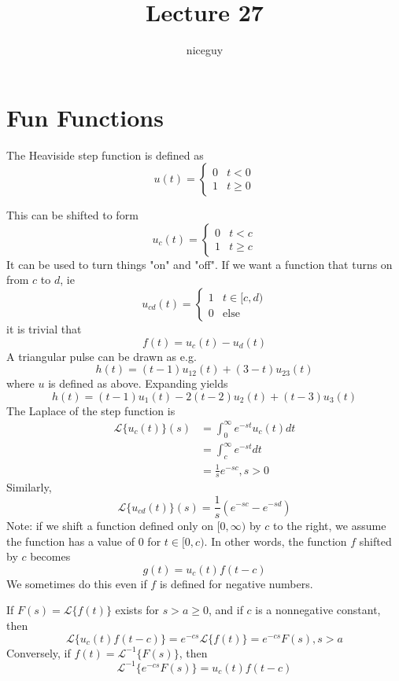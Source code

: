 \documentclass[12pt]{article}
\title{Lecture 27}
\author{niceguy}
\begin{document}
\maketitle

\section{Fun Functions}

\begin{defn}
	The Heaviside step function is defined as
	$$u(t) = \begin{cases} 0 & t < 0 \\ 1 & t \geq 0\end{cases}$$
\end{defn}
This can be shifted to form
$$u_c(t) = \begin{cases} 0 & t < c \\ 1 & t \geq c\end{cases}$$
It can be used to turn things "on" and "off". If we want a function that turns on from $c$ to $d$, ie
$$u_{cd}(t) = \begin{cases} 1 & t \in[c,d) \\ 0 & \text{else}\end{cases}$$
it is trivial that
$$f(t) = u_c(t) - u_d(t)$$
A triangular pulse can be drawn as e.g.
$$h(t) = (t-1)u_{12}(t) + (3-t)u_{23}(t)$$
where $u$ is defined as above. Expanding yields
$$h(t) = (t-1)u_1(t) - 2(t-2)u_2(t) + (t-3)u_3(t)$$
The Laplace of the step function is
\begin{align*}
	\mathcal{L}\{u_c(t)\}(s) &= \int_0^\infty e^{-st}u_c(t)dt \\
				 &= \int_c^\infty e^{-st}dt \\
				 &= \frac{1}{s}e^{-sc}, s > 0
\end{align*}
Similarly,
$$\mathcal{L}\{u_{cd}(t)\}(s) = \frac{1}{s}\left(e^{-sc} - e^{-sd}\right)$$
Note: if we shift a function defined only on $[0,\infty)$ by $c$ to the right, we assume the function has a value of 0 for $t \in [0,c)$. In other words, the function $f$ shifted by $c$ becomes
$$g(t) = u_c(t)f(t-c)$$
We sometimes do this even if $f$ is defined for negative numbers.

\begin{thm}
	If $F(s) = \mathcal{L}\{f(t)\}$ exists for $s > a \geq 0$, and if $c$ is a nonnegative constant, then
	$$\mathcal{L}\{u_c(t)f(t-c)\} = e^{-cs}\mathcal{L}\{f(t)\} = e^{-cs}F(s), s > a$$
	Conversely, if $f(t) = \mathcal{L}^{-1}\{F(s)\}$, then
	$$\mathcal{L}^{-1}\{e^{-cs}F(s)\} = u_c(t)f(t-c)$$
\end{thm}
\end{document}
